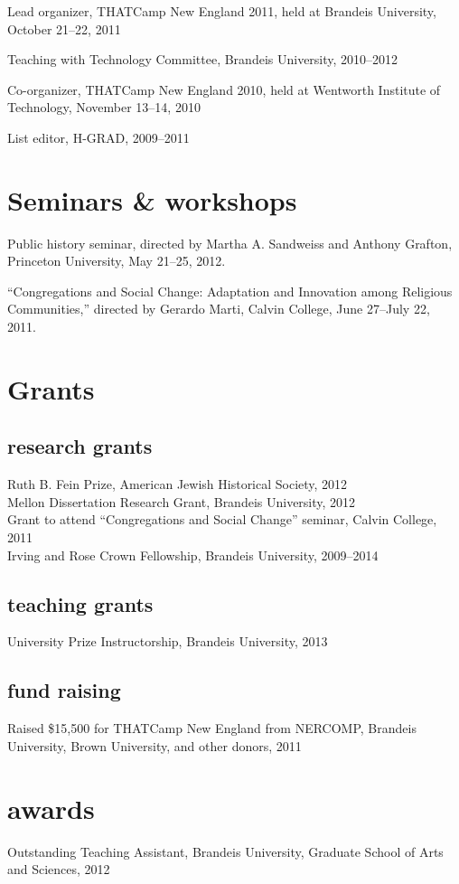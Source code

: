 \documentclass[11pt]{article}
\begin{document}
Lead organizer, THATCamp New England 2011, held at Brandeis University, 
October 21--22, 2011

Teaching with Technology Committee, Brandeis University, 2010--2012

Co-organizer, THATCamp New England 2010, held at Wentworth Institute of 
Technology, November 13--14, 2010

List editor, H-GRAD, 2009--2011

\section{Seminars \& workshops}
Public history seminar, directed by Martha A. Sandweiss and 
Anthony Grafton, Princeton University, May 21--25, 2012.

``Congregations and Social Change: Adaptation and Innovation among 
Religious Communities,'' directed by Gerardo Marti, Calvin College, June 
27--July 22, 2011.

\section{Grants}

\subsection{research grants}
\noindent
Ruth B. Fein Prize, American Jewish Historical Society, 2012\\
Mellon Dissertation Research Grant, Brandeis University, 2012\\
Grant to attend ``Congregations and Social Change'' seminar, Calvin 
College, 2011\\
Irving and Rose Crown Fellowship, Brandeis University, 2009--2014

\subsection{teaching grants}
\noindent
University Prize Instructorship, Brandeis University, 2013

\subsection{fund raising}
\noindent
Raised \$15,500 for THATCamp New England from NERCOMP, Brandeis 
University, Brown University, and other donors, 2011

\section{awards}
\noindent
Outstanding Teaching Assistant, Brandeis University, Graduate School of 
Arts and Sciences, 2012
\end{document}
